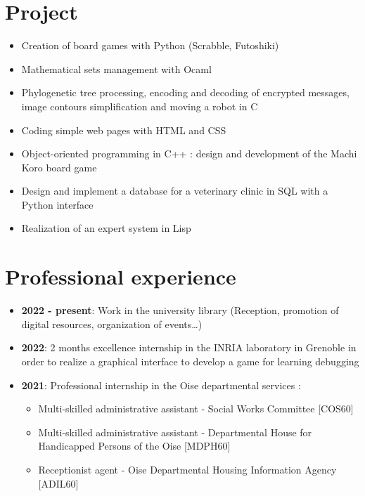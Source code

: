 \documentclass[9pt, oneside, a4paper, titlepage]{extarticle}
\begin{document}
\begin{tcolorbox}
\begin{minipage}[t]{12.8cm}
\begin{tcolorbox}[grow to right by = 0.6cm, colback = gray!25, colframe = white]
                \section*{Project}
                \begin{itemize}
                    \item Creation of board games with Python (Scrabble, Futoshiki)
                    \item Mathematical sets management with Ocaml
                    \item Phylogenetic tree processing, encoding and decoding of 
                    encrypted messages, image contours simplification and moving 
                    a robot in C
                    \item Coding simple web pages with HTML and CSS
                    \item Object-oriented programming in C++ : design and development of the Machi Koro board game
                    \item Design and implement a database for a veterinary clinic in SQL with a Python interface
                    \item Realization of an expert system in Lisp
                \end{itemize}
                
                \section*{Professional experience}
                \begin{itemize}
                    \item \textbf{2022 - present}: Work in the university library (Reception, promotion of digital resources, organization of events\dots)
                    \item \textbf{2022}: 2 months excellence internship in the INRIA 
                    laboratory in Grenoble in order to realize a 
                    graphical interface to develop a game for learning
                    debugging
                    \item \textbf{2021}: Professional internship in the Oise departmental services :
                    \begin{itemize}  
                        \item Multi-skilled administrative assistant -  Social Works Committee [COS60]
                        \item Multi-skilled administrative assistant - Departmental House for Handicapped Persons of the Oise [MDPH60]
                        \item Receptionist agent - Oise Departmental Housing Information Agency [ADIL60]
                    \end{itemize}
                

\end{itemize}
\end{tcolorbox}
\end{minipage}
\end{tcolorbox}
\end{document}
